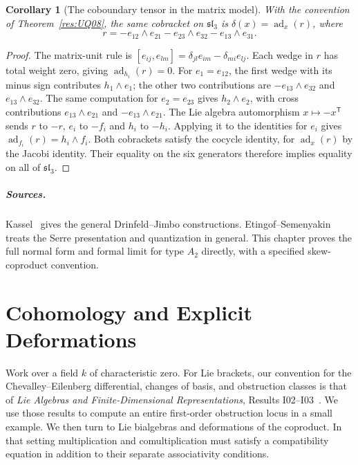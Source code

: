 \documentclass[11pt,oneside,openany]{book}
\newtheorem{corollary}[theorem]{Corollary}
\theoremstyle{definition}
\theoremstyle{remark}
\begin{document}
\begin{corollary}[The coboundary tensor in the matrix model]
\label{res:UQ09}
With the convention of Theorem~\ref{res:UQ08},
the same cobracket on \(\mathfrak{sl}_3\) is
\(\delta(x)=\operatorname{ad}_x(r)\), where
\[
 r=-e_{12}\wedge e_{21}-e_{23}\wedge e_{32}-e_{13}\wedge e_{31}.
\]
\end{corollary}
\begin{proof}
The matrix-unit rule is
\([e_{ij},e_{lm}]=\delta_{jl}e_{im}-\delta_{mi}e_{lj}\).
Each wedge in \(r\) has total weight zero, giving
\(\operatorname{ad}_{h_i}(r)=0\).
For \(e_1=e_{12}\), the first wedge with its minus sign
contributes \(h_1\wedge e_1\); the other two contributions
are \(-e_{13}\wedge e_{32}\) and \(e_{13}\wedge e_{32}\).
The same computation for \(e_2=e_{23}\) gives
\(h_2\wedge e_2\), with cross contributions
\(e_{13}\wedge e_{21}\) and \(-e_{13}\wedge e_{21}\).
The Lie algebra automorphism \(x\mapsto-x^{\mathsf T}\)
sends \(r\) to \(-r\), \(e_i\) to \(-f_i\) and
\(h_i\) to \(-h_i\). Applying it to the identities for
\(e_i\) gives \(\operatorname{ad}_{f_i}(r)=h_i\wedge f_i\).
Both cobrackets satisfy the cocycle identity, for
\(\operatorname{ad}_x(r)\) by the Jacobi identity.
Their equality on the six generators therefore
implies equality on all of \(\mathfrak{sl}_3\).
\end{proof}

\paragraph{Sources.}
Kassel~\cite[Sections XVI.5 and XVII.2]{kassel} gives the
general Drinfeld--Jimbo constructions. Etingof--Semenyakin
~\cite[Sections 4.1--4.2]{etingof-semenyakin} treats the
Serre presentation and quantization in general.
This chapter proves the full normal form and formal limit
for type \(A_2\) directly, with a specified skew-coproduct
convention.
\chapter{Cohomology and Explicit Deformations}

Work over a field \(k\) of characteristic zero. For Lie brackets,
our convention for the Chevalley--Eilenberg differential, changes
of basis, and obstruction classes is that of
\emph{Lie Algebras and Finite-Dimensional Representations},
Results I02--I03~\cite[PDF pp.~56--57]{mg-lie}.
We use those results to compute an entire first-order obstruction
locus in a small example. We then turn to Lie bialgebras and
deformations of the coproduct. In that setting multiplication
and comultiplication must satisfy a compatibility equation
in addition to their separate associativity conditions.
\end{document}

